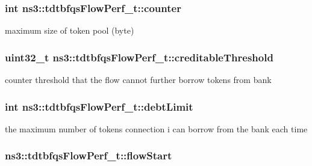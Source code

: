 \subsubsection[{\texorpdfstring{counter}{counter}}]{\setlength{\rightskip}{0pt plus 5cm}int ns3\+::tdtbfqs\+Flow\+Perf\+\_\+t\+::counter}\hypertarget{structns3_1_1tdtbfqsFlowPerf__t_a25cdf10b4de642a11eaa4cc3d79bead0}{}\label{structns3_1_1tdtbfqsFlowPerf__t_a25cdf10b4de642a11eaa4cc3d79bead0}


maximum size of token pool (byte) 

\subsubsection[{\texorpdfstring{creditable\+Threshold}{creditableThreshold}}]{\setlength{\rightskip}{0pt plus 5cm}uint32\+\_\+t ns3\+::tdtbfqs\+Flow\+Perf\+\_\+t\+::creditable\+Threshold}\hypertarget{structns3_1_1tdtbfqsFlowPerf__t_a64c93060e3a4a5a729d5ecb52a1354f9}{}\label{structns3_1_1tdtbfqsFlowPerf__t_a64c93060e3a4a5a729d5ecb52a1354f9}


counter threshold that the flow cannot further borrow tokens from bank 

\subsubsection[{\texorpdfstring{debt\+Limit}{debtLimit}}]{\setlength{\rightskip}{0pt plus 5cm}int ns3\+::tdtbfqs\+Flow\+Perf\+\_\+t\+::debt\+Limit}\hypertarget{structns3_1_1tdtbfqsFlowPerf__t_a07a234eaf1d3054d05d03936923ff683}{}\label{structns3_1_1tdtbfqsFlowPerf__t_a07a234eaf1d3054d05d03936923ff683}


the maximum number of tokens connection i can borrow from the bank each time 

\subsubsection[{\texorpdfstring{flow\+Start}{flowStart}}]{ ns3\+::tdtbfqs\+Flow\+Perf\+\_\+t\+::flow\+Start}\hypertarget{structns3_1_1tdtbfqsFlowPerf__t_aa056fca6cc6c820bbd6befcfc70b3672}{}\label{structns3_1_1tdtbfqsFlowPerf__t_aa056fca6cc6c820bbd6befcfc70b3672}
